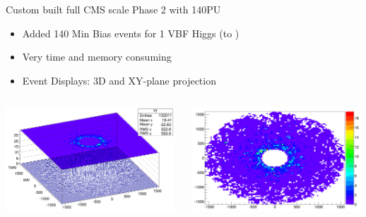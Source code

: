 \documentclass[pdf, 9pt]{beamer}
\begin{document}
  \begin{frame}{Custom built full CMS scale Phase 2 with 140PU}
    \begin{itemize}
      \item Added 140 Min Bias events for 1 VBF Higgs (to \gamma\gamma)
      \item Very time and memory consuming
      \item Event Displays: 3D and XY-plane projection
    \end{itemize}
    \begin{columns}[T]
      \begin{column}{0.5\textwidth}
        \includegraphics[width=0.99\textwidth, height=0.45\textheight]{figs/shashlik_fullscale/XY_EMM_SURF.png}
      \end{column}
      \begin{column}{0.5\textwidth}
        \includegraphics[width=0.99\textwidth, height=0.45\textheight]{figs/shashlik_fullscale/XY_EMP_colz.png}
      \end{column}
    \end{columns}
  \end{frame}
\end{document}
